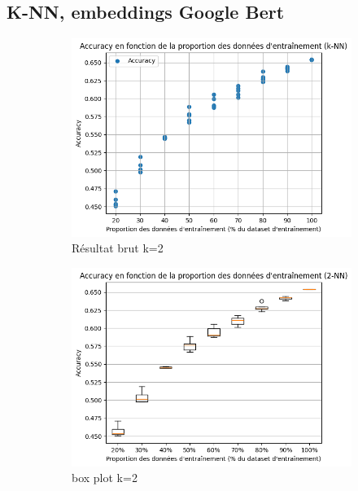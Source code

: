 \documentclass[12pt]{article}
\begin{document}
\subsection{K-NN, embeddings Google Bert}
\begin{figure}[H]
    \centering
    \begin{subfigure}[t]{0.35\textwidth}
        \centering
        \includegraphics[width=\textwidth]{static/knn_goo_2_raw.png} 
        \caption{Résultat brut k=2}
    \end{subfigure}
    \hfill
    \begin{subfigure}[t]{0.35\textwidth}
        \centering
        \includegraphics[width=\textwidth]{static/knn_goo_2.png}
        \caption{box plot k=2}
    \end{subfigure}
    \hfill
    \begin{subfigure}[t]{0.35\textwidth}

\end{subfigure}
\end{figure}
\end{document}

